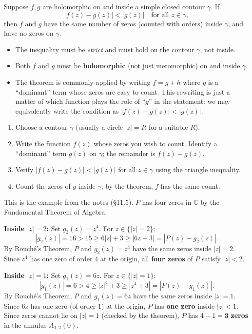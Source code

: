 \documentclass[11pt, a4paper]{article}
\begin{document}
\begin{thmbox}
Suppose $f,g$ are holomorphic on and inside a simple closed contour $\gamma$. If
\[
  |f(z)-g(z)| < |g(z)| \quad \text{for all } z\in\gamma,
\]
then $f$ and $g$ have the same number of zeros (counted with orders) inside $\gamma$, and have no zeros on $\gamma$.
\end{thmbox}

\begin{warnbox}
\begin{itemize}
  \item The inequality must be \emph{strict} and must hold on the contour $\gamma$, not inside.
  \item Both $f$ and $g$ must be \textbf{holomorphic} (not just meromorphic) on and inside $\gamma$.
  \item The theorem is commonly applied by writing $f=g+h$ where $g$ is a ``dominant'' term whose zeros are easy to count. This rewriting is just a matter of which function plays the role of ``$g$'' in the statement: we may equivalently write the condition as $|f(z)-g(z)|<|g(z)|$.
\end{itemize}
\end{warnbox}

\begin{methodbox}
\begin{enumerate}
  \item Choose a contour $\gamma$ (usually a circle $|z|=R$ for a suitable $R$).
  \item Write the function $f(z)$ whose zeros you wish to count. Identify a ``dominant'' term $g(z)$ on $\gamma$; the remainder is $f(z)-g(z)$.
  \item Verify $|f(z)-g(z)|<|g(z)|$ for all $z\in\gamma$ using the triangle inequality.
  \item Count the zeros of $g$ inside $\gamma$; by the theorem, $f$ has the same count.
\end{enumerate}
\end{methodbox}

\begin{exbox}[Zeros of $P(z)=z^4+6z+3$ in the annulus $A_{1,2}(0)=\{1<|z|<2\}$]
This is the example from the notes (\S11.5). $P$ has four zeros in $\mathbb{C}$ by the Fundamental Theorem of Algebra.

\textbf{Inside $|z|=2$:} Set $g_2(z)=z^4$. For $z\in\{|z|=2\}$:
\[
  |g_2(z)|=16 > 15 \geq 6|z|+3 \geq |6z+3| = |P(z)-g_2(z)|.
\]
By Rouch\'e's Theorem, $P$ and $g_2(z)=z^4$ have the same zeros inside $|z|=2$. Since $z^4$ has one zero of order 4 at the origin, all \textbf{four zeros} of $P$ satisfy $|z|<2$.

\textbf{Inside $|z|=1$:} Set $g_1(z)=6z$. For $z\in\{|z|=1\}$:
\[
  |g_1(z)|=6 > 4 \geq |z|^4+3 \geq |z^4+3| = |P(z)-g_1(z)|.
\]
By Rouch\'e's Theorem, $P$ and $g_1(z)=6z$ have the same zeros inside $|z|=1$. Since $6z$ has one zero (of order 1) at the origin, $P$ has \textbf{one zero} inside $|z|<1$. Since zeros cannot lie on $|z|=1$ (checked by the theorem), $P$ has $4-1=\mathbf{3}$ \textbf{zeros} in the annulus $A_{1,2}(0)$.
\end{exbox}
\end{document}
